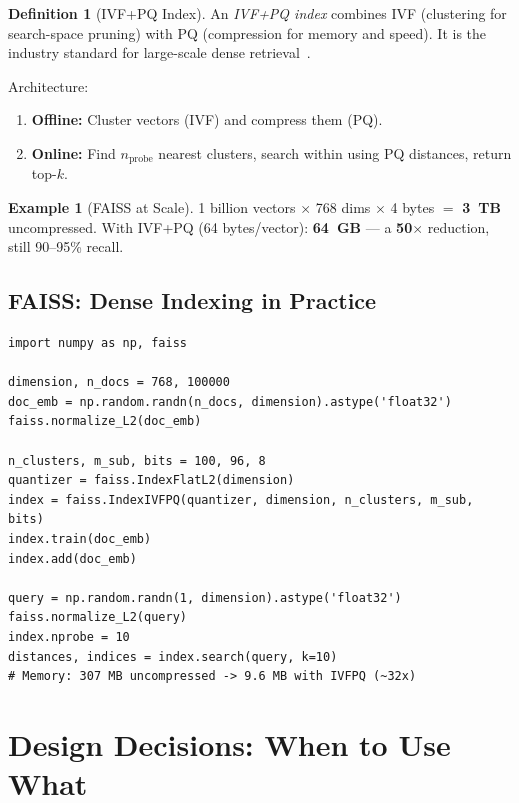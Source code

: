 \documentclass[11pt,a4paper]{article}
\theoremstyle{definition}
\newtheorem{definition}{Definition}[section]
\newtheorem{example}{Example}[section]
\theoremstyle{plain}
\begin{document}
\begin{definition}[IVF+PQ Index]
An \emph{IVF+PQ index} combines IVF (clustering for search-space pruning) with PQ (compression for memory and speed). It is the industry standard for large-scale dense retrieval~\cite{johnson2019billion}.
\end{definition}

Architecture:
\begin{enumerate}[nosep]
    \item \textbf{Offline:} Cluster vectors (IVF) and compress them (PQ).
    \item \textbf{Online:} Find $n_{\mathrm{probe}}$ nearest clusters, search within using PQ distances, return top-$k$.
\end{enumerate}

\begin{example}[FAISS at Scale]
1 billion vectors $\times$ 768 dims $\times$ 4 bytes $=$ \textbf{3~TB} uncompressed.
With IVF+PQ (64 bytes/vector): \textbf{64~GB} --- a \textbf{50$\times$} reduction, still 90--95\% recall.
\end{example}

\subsection{FAISS: Dense Indexing in Practice}

\begin{lstlisting}[caption={Dense indexing with FAISS (IVF+PQ)~\cite{johnson2019billion}.}]
import numpy as np, faiss

dimension, n_docs = 768, 100000
doc_emb = np.random.randn(n_docs, dimension).astype('float32')
faiss.normalize_L2(doc_emb)

n_clusters, m_sub, bits = 100, 96, 8
quantizer = faiss.IndexFlatL2(dimension)
index = faiss.IndexIVFPQ(quantizer, dimension, n_clusters, m_sub, bits)
index.train(doc_emb)
index.add(doc_emb)

query = np.random.randn(1, dimension).astype('float32')
faiss.normalize_L2(query)
index.nprobe = 10
distances, indices = index.search(query, k=10)
# Memory: 307 MB uncompressed -> 9.6 MB with IVFPQ (~32x)
\end{lstlisting}

\section{Design Decisions: When to Use What}
\label{sec:design}
\end{document}
